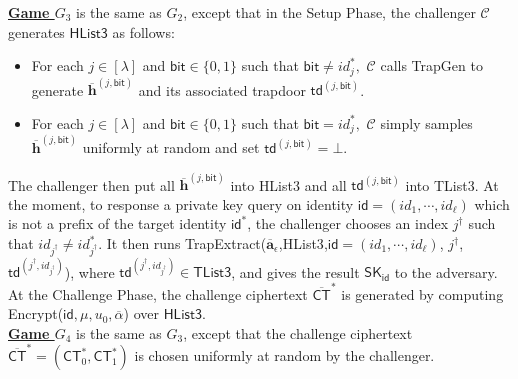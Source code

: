 \documentclass[runningheads]{llncs}
\begin{document}
\noindent\underline{\textbf{Game $G_3$}} is the same as $G_2$, except that in the Setup Phase, the challenger $\mathcal{C}$ generates $\textsf{HList3}$ as follows: 
\begin{itemize}
\item For each $j \in [\lambda]$ and $\textsf{bit}\in\{0,1\}$ such that $\textsf{bit} \neq  id^*_j,$ $\mathcal{C}$ calls \textsf{TrapGen} to generate  $ \overline{\textbf{h}}^{(j,\mathsf{bit})}$ and its associated trapdoor $\textsf{td}^{(j,\textsf{bit})}$.  

\item For each $j \in [\lambda]$ and $\textsf{bit}\in\{0,1\}$ such that $\textsf{bit} =  id^*_j,$ $\mathcal{C}$ simply samples $ \overline{\textbf{h}}^{(j,\mathsf{bit})}$ uniformly at random and set $\textsf{td}^{(j,\textsf{bit})}=\bot$.  
 
\end{itemize}
The challenger then put all $ \overline{\textbf{h}}^{(j,\mathsf{bit})}$ into \textsf{HList3} and all $\textsf{td}^{(j,\textsf{bit})}$ into \textsf{TList3}.
 At the moment, to response a private key query on identity $\textsf{id}=(id_1, \cdots, id_{\ell})$ which is not a prefix of the target identity $\textsf{id}^*$, the challenger chooses an index $j^{\dagger}$ such that $id_{j^{\dagger}}\neq id^*_{j^{\dagger}}$. It then runs \textsf{TrapExtract}($\overline{\textbf{a}}_{\epsilon}$,\textsf{HList3},$\textsf{id}=(id_1, \cdots, id_{\ell})$, $j^{\dagger}$,$\textsf{td}^{(j^{\dagger},id_{j^{\dagger}})}$), where $\textsf{td}^{(j^\dagger,id_{j^\dagger})}  \in \textsf{TList3}$, and gives the result $\textsf{SK}_{\textsf{id}}$ to the adversary.
At the Challenge Phase, the challenge ciphertext $\overline{\textsf{CT}}^*$ is generated by computing \textsf{Encrypt}($\mathsf{id},\mu, u_0, \overline{\alpha}$) over $\mathsf{HList3}$.\\

\noindent\underline{\textbf{Game $G_4$}}  is the same as $G_3$, 
except that the challenge ciphertext $\overline{\textsf{CT}}^*=(\textsf{CT}^*_0, \textsf{CT}^*_1)$ 
is chosen uniformly at random by the challenger. 
\end{document}
